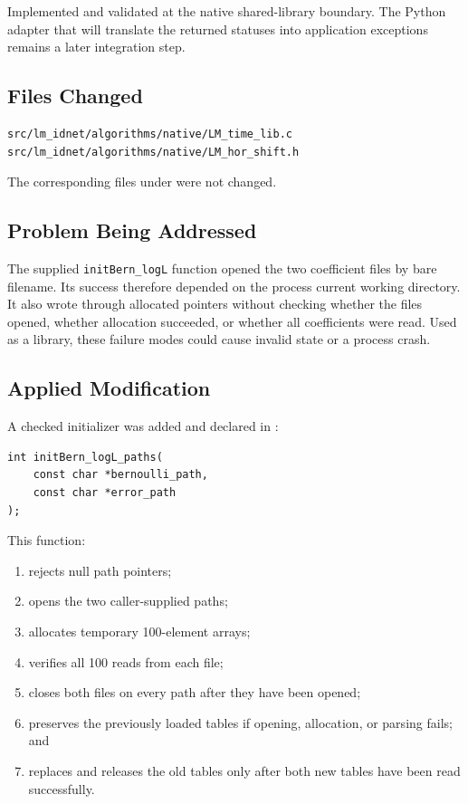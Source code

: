 \documentclass[11pt,a4paper]{article}
\begin{document}
Implemented and validated at the native shared-library boundary. The Python adapter that
will translate the returned statuses into application exceptions remains a later
integration step.

\subsection{Files Changed}

\begin{verbatim}
src/lm_idnet/algorithms/native/LM_time_lib.c
src/lm_idnet/algorithms/native/LM_hor_shift.h
\end{verbatim}

The corresponding files under  were not changed.

\subsection{Problem Being Addressed}

The supplied \texttt{initBern\_logL} function opened the two coefficient files by
bare filename. Its success therefore depended on the process current working
directory. It also wrote through allocated pointers without checking whether
the files opened, whether allocation succeeded, or whether all coefficients
were read. Used as a library, these failure modes could cause invalid state or
a process crash.

\subsection{Applied Modification}

A checked initializer was added and declared in :

\begin{verbatim}
int initBern_logL_paths(
    const char *bernoulli_path,
    const char *error_path
);
\end{verbatim}

This function:

\begin{enumerate}

\item rejects null path pointers;

\item opens the two caller-supplied paths;

\item allocates temporary 100-element arrays;

\item verifies all 100 reads from each file;

\item closes both files on every path after they have been opened;

\item preserves the previously loaded tables if opening, allocation, or
parsing fails; and

\item replaces and releases the old tables only after both new tables have
been read successfully.

\end{enumerate}
\end{document}
